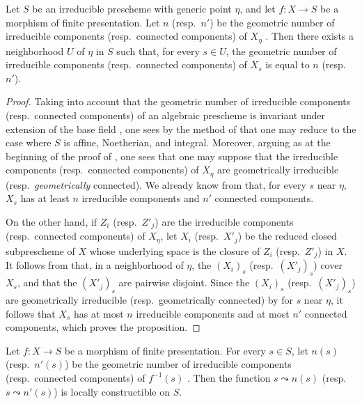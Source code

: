 \begin{proposition}[9.7.8]
\label{IV.9.7.8}
Let $S$ be an irreducible prescheme with generic point $\eta$, and let $f:X\to S$ be a morphism of finite presentation. Let $n$ \textup{(resp.\ $n'$)} be the geometric number of irreducible components \textup{(resp.}\ connected components\textup{)} of $X_\eta$ . Then there exists a neighborhood $U$ of $\eta$ in $S$ such that, for every $s\in U$, the geometric number of irreducible components \textup{(resp.}\ connected components\textup{)} of $X_s$ is equal to $n$ \textup{(resp.\ $n'$)}.
\end{proposition}

\begin{proof}
Taking into account that the geometric number of irreducible components (resp.\ connected components) of an algebraic prescheme is invariant under extension of the base field , one sees by the method of  that one may reduce to the case where $S$ is affine, Noetherian, and integral. Moreover, arguing as at the beginning of the proof of , one sees that one may suppose that the irreducible components (resp.\ connected components) of $X_\eta$ are geometrically irreducible (resp.\ \emph{geometrically} connected). We already know from  that, for every $s$ near $\eta$, $X_s$ has at least $n$ irreducible components and $n'$ connected components.

On the other hand, if $Z_i$ (resp.\ $Z'_j$) are the irreducible components (resp.\ connected components) of $X_\eta$, let $X_i$ (resp.\ $X'_j$) be the reduced closed subprescheme of $X$ whose underlying space is the closure of $Z_i$ (resp.\ $Z'_j$) in $X$. It follows from  that, in a neighborhood of $\eta$, the $(X_i)_s$ (resp.\ $(X'_j)_s$) cover $X_s$, and that the $(X'_j)_s$ are pairwise disjoint. Since the $(X_i)_s$ (resp.\ $(X'_j)_s$) are geometrically irreducible (resp.\ geometrically connected) by  for $s$ near $\eta$, it follows that $X_s$ has at most $n$ irreducible components and at most $n'$ connected components, which proves the proposition.
\end{proof}

\begin{corollary}[9.7.9]
\label{IV.9.7.9}
Let $f:X\to S$ be a morphism of finite presentation. For every $s\in S$, let $n(s)$ \textup{(resp.\ $n'(s)$)} be the geometric number of irreducible components \textup{(resp.}\ connected components\textup{)} of $f^{-1}(s)$ . Then the function $s\leadsto n(s)$ \textup{(resp.\ $s\leadsto n'(s)$)} is locally constructible on $S$.
\end{corollary}

